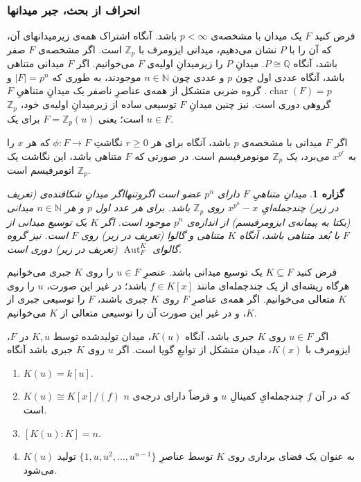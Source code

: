 \documentclass[12pt,a4paper]{article}
\theoremstyle{colorhead}
\newtheorem{prop}[thm]{گزاره}
\DeclareMathOperator{\chara}{char}
\DeclareMathOperator{\Aut}{Aut}
\begin{document}
\subsubsection{انحراف از بحث، جبر میدانها}
فرض کنید
$F$
یک میدان با مشخصه‌ی 
$p<\infty$
باشد. آنگاه اشتراک همه‌ی زیرمیدانهای آن، 
که آن را 
با
$P$
نشان می‌دهیم،
میدانی ایزومرف با
$\mathbb{Z}_p$
است. اگر
مشخصه‌ی
$F$
صفر باشد، آنگاه
$P\cong \mathbb{Q}$.
میدانِ
$P$
را زیرمیدانِ اولیه‌ی
$F$
می‌خوانیم. 
اگر
$F$
میدانی متناهی باشد، آنگاه
عددی اول چون
$p$
و عددی چون
$n\in \mathbb{N}$
موجودند، به طوری که
$|F|=p^n$ 
و 
$\chara(F)=p$.
گروه ضربی متشکل از همه‌ی عناصرِ
ناصفر یک میدانِ متناهیِ
$F$
گروهی دوری است. نیز چنین میدانِ
$F$
توسیعی ساده از زیرمیدانِ
اولیه‌ی خود،
$\mathbb{Z}_p$
است؛ یعنی
$F=\mathbb{Z}_p(u)$
برای یک
$u\in F$.
\par 
اگر
$F$
میدانی با مشخصه‌ی
$p$
باشد، آنگاه 
برای هر
$r\geq 0$
نگاشتِ
$\phi:F\to F$
که هر 
$x$
را به 
$x^{p^r}$
می‌برد، یک
$\mathbb{Z}_p$
مونومرفیسم است. در صورتی که
$F$
متناهی باشد، این نگاشت یک
$\mathbb{Z}_p$
اتومرفیسم است. 
\begin{prop}
میدانِ
متناهیِ
$F$
دارای 
$p^n$
عضو است اگروتنهااگر میدانِ شکافنده‌ی 
(تعریف در زیر)
چندجمله‌ایِ
$x^{p^n}-x$
روی
$\mathbb{Z}_p$
باشد. برای هر عدد اول
$p$
و هر
$n\in \mathbb{N}$
میدانی (یکتا به پیمانه‌ی ایزومرفیسم) از اندازه‌ی
$p^n$
موجود است.
اگر
$K$
یک توسیع میدانی از
$F$
با بُعد متناهی باشد، آنگاه
$K$
متناهی و گالوا (تعریف در زیر) روی
$F$
است. نیز گروه گالوای
 $\Aut_F^K$
 (تعریف در زیر)
دوری است. 
\end{prop}
فرض کنید
$K\subseteq F$
یک توسیع میدانی باشد. عنصرِ
$u\in F$
را روی
$K$
جبری می‌خوانیم هرگاه ریشه‌ای از یک چندجمله‌ای مانند
$f\in K[x]$
باشد؛ در غیر این صورت،
$u$
را روی
$K$
متعالی می‌خوانیم. اگر
همه‌ی عناصرِ
$F$
روی
$K$
جبری باشند، 
$F$
را توسیعی جبری از
$K$،
و در غیر این صورت آن را توسیعی متعالی از
$K$
می‌خوانیم. 
\par 
اگر
$u\in F$
روی
$K$
جبری باشد، آنگاه
$K(u)$،
میدان تولیدشده توسط
$K,u$
در
$F$،
ایزومرف با
$K(x)$،
میدان متشکل از توابعِ گویا است. اگر
$u$
روی
$K$
جبری باشد آنگاه
\begin{enumerate}
\item 
$K(u)=k[u]$.
\item 
$K(u)\cong K[x]/(f)$
که در آن
$f$
چندجمله‌ایِ 
کمینالِ
$u$
و فرضاً دارای  درجه‌ی
$n$
است.
\item 
$[K(u):K]=n$.
\item 
$K(u)$
به عنوان یک فضای برداری روی
$K$
توسط عناصرِ
$\{1,u,u^2,\ldots,u^{n-1}\}$
تولید می‌شود. 
\end{enumerate}
\end{document}
